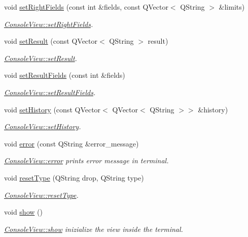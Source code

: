 \begin{DoxyCompactItemize}
void \hyperlink{class_console_view_a2b9ba00770ebdeda35f2b506c752248e}{set\+Right\+Fields} (const int \&fields, const Q\+Vector$<$ Q\+String $>$ \&limits)
\begin{DoxyCompactList}\small\item\em \hyperlink{class_console_view_a2b9ba00770ebdeda35f2b506c752248e}{Console\+View\+::set\+Right\+Fields}. \end{DoxyCompactList}\item 
void \hyperlink{class_console_view_a0b43a9e8d693b227fcd3a00b7a384e37}{set\+Result} (const Q\+Vector$<$ Q\+String $>$ result)
\begin{DoxyCompactList}\small\item\em \hyperlink{class_console_view_a0b43a9e8d693b227fcd3a00b7a384e37}{Console\+View\+::set\+Result}. \end{DoxyCompactList}\item 
void \hyperlink{class_console_view_afeb190605800a7ce7b8b3224a32b15a3}{set\+Result\+Fields} (const int \&fields)
\begin{DoxyCompactList}\small\item\em \hyperlink{class_console_view_afeb190605800a7ce7b8b3224a32b15a3}{Console\+View\+::set\+Result\+Fields}. \end{DoxyCompactList}\item 
void \hyperlink{class_console_view_acd2e5ae5d77096c4227c2c9c5881926b}{set\+History} (const Q\+Vector$<$ Q\+Vector$<$ Q\+String $>$$>$ \&history)
\begin{DoxyCompactList}\small\item\em \hyperlink{class_console_view_acd2e5ae5d77096c4227c2c9c5881926b}{Console\+View\+::set\+History}. \end{DoxyCompactList}\item 
void \hyperlink{class_console_view_a3c5b8df5fd316a1190f7beaa0460b29a}{error} (const Q\+String \&error\+\_\+message)
\begin{DoxyCompactList}\small\item\em \hyperlink{class_console_view_a3c5b8df5fd316a1190f7beaa0460b29a}{Console\+View\+::error} prints error message in terminal. \end{DoxyCompactList}\item 
void \hyperlink{class_console_view_aba1141da17dd4f424ae296142ff7a8bd}{reset\+Type} (Q\+String drop, Q\+String type)
\begin{DoxyCompactList}\small\item\em \hyperlink{class_console_view_aba1141da17dd4f424ae296142ff7a8bd}{Console\+View\+::reset\+Type}. \end{DoxyCompactList}\item 
\mbox{\label{class_console_view_a64444203b69213adbe63da93d3d03cb4}} 
void \hyperlink{class_console_view_a64444203b69213adbe63da93d3d03cb4}{show} ()
\begin{DoxyCompactList}\small\item\em \hyperlink{class_console_view_a64444203b69213adbe63da93d3d03cb4}{Console\+View\+::show} inizialize the view inside the terminal. \end{DoxyCompactList}\end{DoxyCompactItemize}
